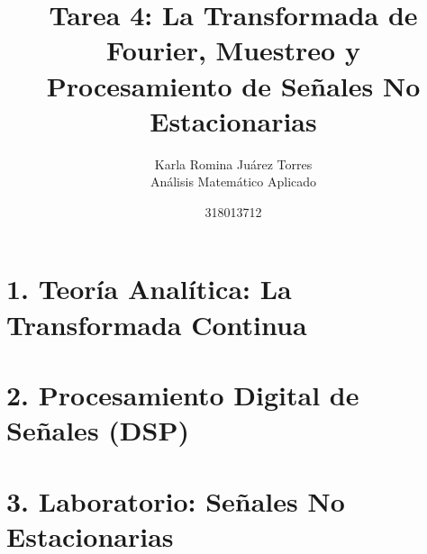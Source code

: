 \documentclass[12pt]{article}
\title{Tarea 4: La Transformada de Fourier, Muestreo y \\ Procesamiento de Señales No Estacionarias}
\author{Karla Romina Juárez Torres \\ \small Análisis Matemático Aplicado}
\date{318013712}
\begin{document}
\maketitle

\section*{1. Teoría Analítica: La Transformada Continua}



\section*{2. Procesamiento Digital de Señales (DSP)}



\section*{3. Laboratorio: Señales No Estacionarias}


\end{document}
